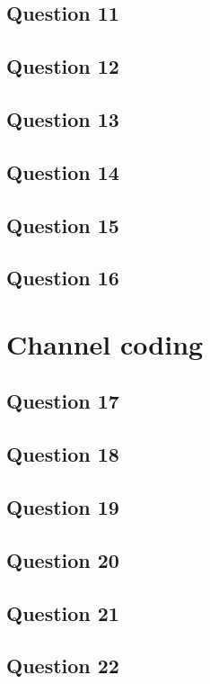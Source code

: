 \documentclass[]{template}
\begin{document}
    \subsection{Question 11}

    \subsection{Question 12}

    \subsection{Question 13}

    \subsection{Question 14}

    \subsection{Question 15}

    \subsection{Question 16}

\section{Channel coding}

    \subsection{Question 17}

    \subsection{Question 18}

    \subsection{Question 19}

    \subsection{Question 20}

    \subsection{Question 21}

    \subsection{Question 22}
\end{document}
